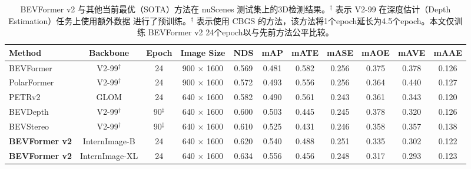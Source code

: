 \setlength{\tabcolsep}{3pt}
\setlength{\doublerulesep}{2\arrayrulewidth}
\renewcommand{\arraystretch}{1.1}
\begin{table}[t]
    \caption{BEVFormer v2 与其他当前最优（SOTA）方法在 nuScenes 测试集上的3D检测结果。$^\dagger$ 表示 V2-99 \cite{Vovnet} 在深度估计（Depth Estimation）任务上使用额外数据 \cite{DD3D} 进行了预训练。$^\ddagger$ 表示使用 CBGS 的方法，该方法将1个epoch延长为4.5个epoch。本文仅训练 BEVFormer v2 24个epoch以与先前方法公平比较。}
    \label{table:sota_nuscenes}
    \centering

    \begin{tabular}{l|c|c|c|cc|ccccc}
        \toprule
        Method & Backbone & Epoch & Image Size & NDS & mAP & mATE & mASE & mAOE & mAVE & mAAE \\ 
        \midrule
        BEVFormer~\cite{bevformer} & V2-99$^\dagger$ & 24 & 900 $\times$ 1600 & 0.569 & 0.481 & 0.582 & 0.256 & 0.375 & 0.378 & 0.126 \\
        PolarFormer~\cite{polarformer} & V2-99$^\dagger$ & 24 & 900 $\times$ 1600 & 0.572 & 0.493 & 0.556 & 0.256 & 0.364 & 0.440 & 0.127 \\
        PETRv2~\cite{petrv2} & GLOM & 24 & 640 $\times$ 1600 & 0.582 & 0.490 & 0.561 & 0.243 & 0.361 & 0.343 & 0.120 \\
        BEVDepth~\cite{bevdepth} & V2-99$^\dagger$ & 90$^\ddagger$ & 640 $\times$ 1600 & 0.600 & 0.503 & 0.445 & 0.245 & 0.378 & 0.320 & 0.126 \\
        BEVStereo~\cite{bevstereo} & V2-99$^\dagger$ & 90$^\ddagger$ & 640 $\times$ 1600 & 0.610 & 0.525 & 0.431 & 0.246 & 0.358 & 0.357 & 0.138 \\
        \midrule
        \textbf{BEVFormer v2} & InternImage-B & 24 & 640 $\times$ 1600 & 0.620 & 0.540 & 0.488 & 0.251 & 0.335 & 0.302 & 0.122 \\
        \textbf{BEVFormer v2} & InternImage-XL & 24 & 640 $\times$ 1600 & 0.634 & 0.556 & 0.456 & 0.248 & 0.317 & 0.293 & 0.123 \\
        \bottomrule
    \end{tabular}

\end{table}